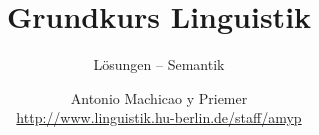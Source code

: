 \documentclass[10pt,handout]{beamer}
\begin{document}
	
	


\toggletrue{toc}





\title{Grundkurs Linguistik}

\subtitle{Lösungen -- Semantik}

\author[A. Machicao y Priemer]{
	{\small Antonio Machicao y Priemer}
	\\
	{\footnotesize \url{http://www.linguistik.hu-berlin.de/staff/amyp}}
}







\end{document}

